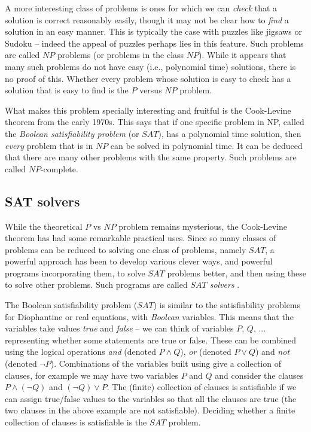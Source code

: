\documentclass{amsart}
\theoremstyle{plain}
\theoremstyle{definition}
\theoremstyle{remark}
\begin{document}
A more interesting class of problems is ones for which we can
\emph{check} that a solution is correct reasonably easily, though it may
not be clear how to \emph{find} a solution in an easy manner. This is
typically the case with puzzles like jigsaws or Sudoku -- indeed the
appeal of puzzles perhaps lies in this feature. Such problems are called
\(NP\) problems (or problems in the class \(NP\)). While it appears that
many such problems do not have easy (i.e., polynomial time) solutions,
there is no proof of this. Whether every problem whose solution is easy
to check has a solution that is easy to find is the \(P\) versus \(NP\)
problem.

What makes this problem specially interesting and fruitful is the
Cook-Levine theorem from the early 1970s. This says that if one specific
problem in NP, called the \emph{Boolean satisfiability problem} (or
\(SAT\)), has a polynomial time solution, then \emph{every} problem that
is in \(NP\) can be solved in polynomial time. It can be deduced that
there are many other problems with the same property. Such problems are
called \(NP\)-complete.

\hypertarget{sat-solvers}{%
	\subsection{SAT solvers}\label{sat-solvers}}

While the theoretical \(P\) vs \(NP\) problem remains mysterious, the
Cook-Levine theorem has had some remarkable practical uses. Since so
many classes of problems can be reduced to solving one class of
problems, namely \(SAT\), a powerful approach has been to develop
various clever ways, and powerful programs incorporating them, to solve
\(SAT\) problems better, and then using these to solve other problems.
Such programs are called \emph{\(SAT\) solvers} .

The Boolean satisfiability problem (\(SAT\)) is similar to the satisfiability
problems for Diophantine or real equations, with \emph{Boolean} variables.
This means that the variables take values \emph{true} and \emph{false} -- we
can think of variables $P$, $Q$, ... representing whether some statements are
true or false. These can be combined using the logical operations \emph{and}
(denoted $P\wedge Q$), \emph{or} (denoted $P\vee Q$) and \emph{not} (denoted $\neg P$).
Combinations of the variables built using give a collection of clauses, for example we
may have two variables $P$ and $Q$ and consider the clauses $P\wedge(\neg Q)$ and $(\neg Q)\vee P$.
The (finite) collection of clauses is satisfiable if we can assign true/false values to the variables
so that all the clauses are true (the two clauses in the above example are not satisfiable). 
Deciding whether a finite collection of clauses is satisfiable is 
the $SAT$ problem.
\end{document}
